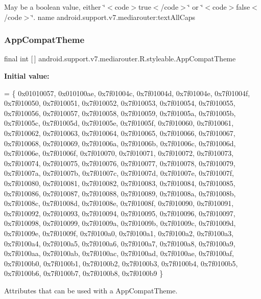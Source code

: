 May be a boolean value, either \char`\"{}$<$code$>$true$<$/code$>$\char`\"{} or \char`\"{}$<$code$>$false$<$/code$>$\char`\"{}.  name android.\+support.\+v7.\+mediarouter\+:text\+All\+Caps \mbox{\label{classandroid_1_1support_1_1v7_1_1mediarouter_1_1R_1_1styleable_a4e3d3900c75d49aeb2f283cac00214d6}} 
\subsubsection{\texorpdfstring{App\+Compat\+Theme}{AppCompatTheme}}
{\footnotesize\ttfamily final int \mbox{[}$\,$\mbox{]} android.\+support.\+v7.\+mediarouter.\+R.\+styleable.\+App\+Compat\+Theme\hspace{0.3cm}{\ttfamily [static]}}

{\bfseries Initial value\+:}
\begin{DoxyCode}
= \{
            0x01010057, 0x010100ae, 0x7f01004c, 0x7f01004d,
            0x7f01004e, 0x7f01004f, 0x7f010050, 0x7f010051,
            0x7f010052, 0x7f010053, 0x7f010054, 0x7f010055,
            0x7f010056, 0x7f010057, 0x7f010058, 0x7f010059,
            0x7f01005a, 0x7f01005b, 0x7f01005c, 0x7f01005d,
            0x7f01005e, 0x7f01005f, 0x7f010060, 0x7f010061,
            0x7f010062, 0x7f010063, 0x7f010064, 0x7f010065,
            0x7f010066, 0x7f010067, 0x7f010068, 0x7f010069,
            0x7f01006a, 0x7f01006b, 0x7f01006c, 0x7f01006d,
            0x7f01006e, 0x7f01006f, 0x7f010070, 0x7f010071,
            0x7f010072, 0x7f010073, 0x7f010074, 0x7f010075,
            0x7f010076, 0x7f010077, 0x7f010078, 0x7f010079,
            0x7f01007a, 0x7f01007b, 0x7f01007c, 0x7f01007d,
            0x7f01007e, 0x7f01007f, 0x7f010080, 0x7f010081,
            0x7f010082, 0x7f010083, 0x7f010084, 0x7f010085,
            0x7f010086, 0x7f010087, 0x7f010088, 0x7f010089,
            0x7f01008a, 0x7f01008b, 0x7f01008c, 0x7f01008d,
            0x7f01008e, 0x7f01008f, 0x7f010090, 0x7f010091,
            0x7f010092, 0x7f010093, 0x7f010094, 0x7f010095,
            0x7f010096, 0x7f010097, 0x7f010098, 0x7f010099,
            0x7f01009a, 0x7f01009b, 0x7f01009c, 0x7f01009d,
            0x7f01009e, 0x7f01009f, 0x7f0100a0, 0x7f0100a1,
            0x7f0100a2, 0x7f0100a3, 0x7f0100a4, 0x7f0100a5,
            0x7f0100a6, 0x7f0100a7, 0x7f0100a8, 0x7f0100a9,
            0x7f0100aa, 0x7f0100ab, 0x7f0100ac, 0x7f0100ad,
            0x7f0100ae, 0x7f0100af, 0x7f0100b0, 0x7f0100b1,
            0x7f0100b2, 0x7f0100b3, 0x7f0100b4, 0x7f0100b5,
            0x7f0100b6, 0x7f0100b7, 0x7f0100b8, 0x7f0100b9
        \}
\end{DoxyCode}
Attributes that can be used with a App\+Compat\+Theme. 

